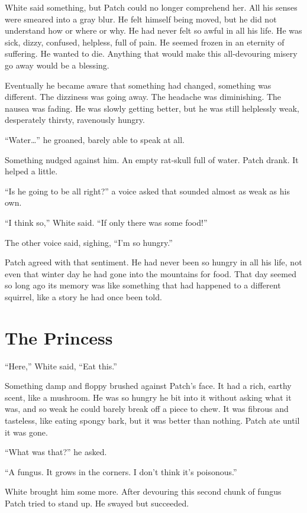 \documentclass[ebook,oneside,openany,17pt]{memoir}
\newenvironment{tolerant}[1]{%
  \par\tolerance=#1\relax
}{%
  \par
}
\renewcommand{\thechapter}{\Roman{chapter}}
\newcounter{sections}
\newcommand{\sections}[1]{%
  \section*{#1}
  \addtocounter{sections}{1}%
  \pdfbookmark[1]{#1}{section.\thechapter.\thesections}}
\begin{document}
White said something, but Patch could no longer comprehend her. All
his senses were smeared into a gray blur. He felt himself being moved,
but he did not understand how or where or why. He had never felt so
awful in all his life. He was sick, dizzy, confused, helpless, full of
pain. He seemed frozen in an eternity of suffering. He wanted to
die. Anything that would make this all-devouring misery go away would
be a blessing.

\begin{tolerant}{500}
Eventually he became aware that something had changed, something was
different. The dizziness was going away. The headache was
diminishing. The nausea was fading. He was slowly getting better, but
he was still helplessly weak, desperately thirsty, raven\-ous\-ly hungry.
\end{tolerant}

“Water…” he groaned, barely able to speak at all.

Something nudged against him. An empty rat-skull full of water. Patch
drank. It helped a little.

“Is he going to be all right?” a voice asked that sounded almost as
weak as his own.

“I think so,” White said. “If only there was some food!”

The other voice said, sighing, “I’m so hungry.”

Patch agreed with that sentiment. He had never been so hungry in all
his life, not even that winter day he had gone into the mountains for
food. That day seemed so long ago its memory was like something that
had happened to a different squirrel, like a story he had once been
told.


\sections{The Princess}

“Here,” White said, “Eat this.”

\begin{tolerant}{5000}
Something damp and floppy brushed against Patch’s face. It had a rich,
earthy scent, like a mushroom. He was so hungry he bit into it without
asking what it was, and so weak he could barely break off a piece to
chew. It was fibrous and tasteless, like eating spongy bark, but it
was better than nothing. Patch ate until it was gone.
\end{tolerant}

“What was that?” he asked.

“A fungus. It grows in the corners. I don’t think it’s poisonous.”

White brought him some more. After devouring this second chunk of
fungus Patch tried to stand up. He swayed but succeeded.
\end{document}
